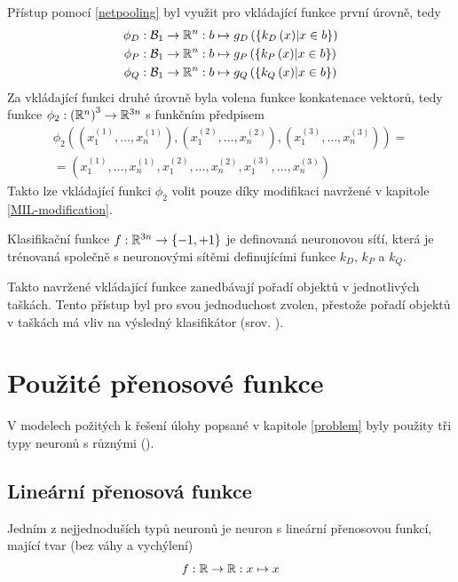 Přístup pomocí \eqref{netpooling} byl využit pro vkládající funkce první úrovně, tedy
\begin{align*}
	\phi_D &: \mathcal B_1 \to \mathbb R^n : b \mapsto g_D \left( \left\{ k_D \left( x \right) \middle| x \in b \right\} \right) \\
	\phi_P &: \mathcal B_1 \to \mathbb R^n : b \mapsto g_P \left( \left\{ k_P \left( x \right) \middle| x \in b \right\} \right) \\
	\phi_Q &: \mathcal B_1 \to \mathbb R^n : b \mapsto g_Q \left( \left\{ k_Q \left( x \right) \middle| x \in b \right\} \right)
\end{align*}
Za vkládající funkci druhé úrovně byla volena funkce konkatenace vektorů, tedy funkce \( \phi_2 : \left( \mathbb R^n \right)^3  \to \mathbb R^{3n} \) s funkčním předpisem
\begin{multline}
	\phi_2 \left( \left( x_1^{(1)}, \dots, x_n^{(1)} \right), \left( x_1^{(2)}, \dots, x_n^{(2)} \right), \left( x_1^{(3)}, \dots, x_n^{(3)} \right) \right) = \\
	= \left( x_1^{(1)}, \dots, x_n^{(1)}, x_1^{(2)}, \dots, x_n^{(2)}, x_1^{(3)}, \dots, x_n^{(3)} \right)
\end{multline}
Takto lze vkládající funkci \( \phi_2 \) volit pouze díky modifikaci navržené v kapitole \ref{MIL-modification}.

Klasifikační funkce \( f : \mathbb R^{3n} \to \left\{ -1, +1 \right\} \) je definovaná neuronovou síťí, která je trénovaná společně s neuronovými sítěmi definujícími funkce \( k_D \), \( k_P \) a \( k_Q \).

Takto navržené vkládající funkce zanedbávají pořadí objektů v jednotlivých taškách. Tento přístup byl pro svou jednoduchost zvolen, přestože pořadí objektů v taškách má vliv na výsledný klasifikátor (srov. \cite{vinyals_order_2015}).

\section{Použité přenosové funkce}
V modelech požitých k řešení úlohy popsané v kapitole \ref{problem} byly použity tři typy neuronů s různými  ().

\subsection{Lineární přenosová funkce}
Jedním z nejjednoduších typů neuronů je neuron s lineární přenosovou funkcí, mající tvar (bez váhy a vychýlení)
\[ f : \mathbb R \to \mathbb R : x \mapsto x \]


